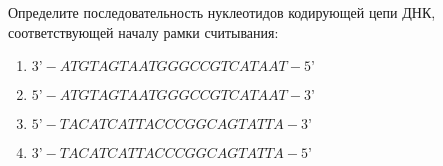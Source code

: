 
Определите последовательность нуклеотидов
кодирующей цепи ДНК, соответствующей началу рамки считывания:

\begin{enumerate}
    \item $3’-ATGTAGTAATGGGCCGTCATAAT-5’$
    \item $5’-ATGTAGTAATGGGCCGTCATAAT-3’$
    \item $5’-TACATCATTACCCGGCAGTATTA-3’$
    \item $3’-TACATCATTACCCGGCAGTATTA-5’$
\end{enumerate}



